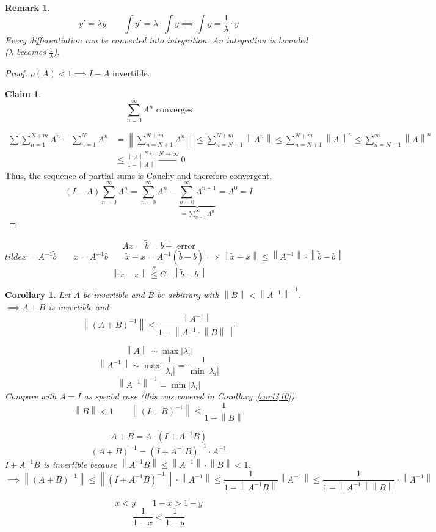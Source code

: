 \documentclass{article}
\newtheorem*{claim}{Claim}%
\newtheorem{remark}{Remark}  \numberwithin{remark}{section}
\newtheorem{corollary}{Corollary}  \numberwithin{corollary}{section}
\newcommand{\norm}[1]{\left\|#1\right\|}
\newcommand{\card}[1]{\left|#1\right|}
\begin{document}
\begin{remark}
  \[ y' = \lambda y \qquad \int y' = \lambda \cdot \int y \implies \int y = \frac1{\lambda} \cdot y \]
  Every differentiation can be converted into integration. An integration is bounded ($\lambda$ becomes $\frac1{\lambda}$).
\end{remark}

\begin{proof}
  $\rho(A) < 1 \implies I - A$ invertible.
  \begin{claim}
    \[ \sum_{n=0}^\infty A^n \text{ converges} \]
  \end{claim}
  \begin{align*}
    \sum{\sum_{n=1}^{N+m} A^n - \sum_{n=1}^N A^n}
      &= \norm{\sum_{n=N+1}^{N+m} A^n} \leq \sum_{n=N+1}^{N+m} \norm{A^n} \leq \sum_{n=N+1}^{N+m} \norm{A}^n \leq \sum_{n=N+1}^\infty \norm{A}^n \\
      &\leq \frac{\norm{A}^{N+1}}{1 - \norm{A}} \xrightarrow{N \to \infty} 0
  \end{align*}
  Thus, the sequence of partial sums is Cauchy and therefore convergent.
  \[ (I - A) \sum_{n=0}^\infty A^n = \sum_{n=0}^\infty A^n - \underbrace{\sum_{n=0}^\infty A^{n+1}}_{= \sum_{n=1}^\infty A^n} = A^0 = I \]
\end{proof}

\[ Ax = \tilde b = b + \text{ error} \]
\[ tilde x = A^{-1} \tilde b \qquad x = A^{-1} b \qquad \tilde x - x = A^{-1} (\tilde b - b) \implies \norm{\tilde x - x} \leq \norm{A^{-1}} \cdot \norm{\tilde b - b} \]
\[ \norm{\tilde x - x} \overset{\text{?}}\leq C \cdot \norm{\tilde b - b} \]

\begin{corollary} %
  Let $A$ be invertible and $B$ be arbitrary with $\norm{B} < \norm{A^{-1}}^{-1}$.
  $\implies A + B$ is invertible and
  \[ \norm{(A + B)^{-1}} \leq \frac{\norm{A^{-1}}}{1 - \norm{A^{-1} \cdot \norm{B}}} \]

  \[ \norm{A} \sim \max\card{\lambda_i} \]
  \[ \norm{A^{-1}} \sim \max\frac{1}{\card{\lambda_i}} = \frac{1}{\min\card{\lambda_i}} \]
  \[ \norm{A^{-1}}^{-1} = \min\card{\lambda_i} \]
  Compare with $A = I$ as special case (this was covered in Corollary~\ref{cor1410}).
  \[ \norm{B} < 1 \qquad \norm{(I + B)^{-1}} \leq \frac{1}{1 - \norm{B}} \]

  \[ A + B = A \cdot (I + A^{-1} B) \]
  \[ (A + B)^{-1} = (I + A^{-1} B)^{-1} \cdot A^{-1} \]
  $I + A^{-1} B$ is invertible because $\norm{A^{-1} B} \leq \norm{A^{-1}} \cdot \norm{B} < 1$.
  \[ \implies \norm{(A + B)^{-1}} \leq \norm{(I + A^{-1} B)^{-1}} \cdot \norm{A^{-1}} \leq \frac{1}{1 - \norm{A^{-1} B}} \norm{A^{-1}} \leq \frac{1}{1 - \norm{A^{-1}} \norm{B}} \cdot \norm{A^{-1}} \]

  \[ x < y \qquad 1 - x > 1 - y \]
  \[ \frac{1}{1 - x} < \frac{1}{1 - y} \]
\end{corollary}
\end{document}
